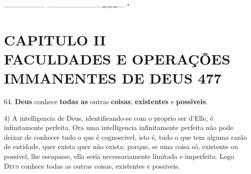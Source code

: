  ------------------ ------------------------===--- "


\chapter*{CAPITULO II\\[0.3em]\large FACULDADES E OPERAÇÕES IMMANENTES DE DEUS 477}

64. \textbf{Deus} conhece \textbf{todas as} outras \textbf{coisas}, \textbf{existentes} e \textbf{possiveis}.

4) A intelligencia de Deus, identifieando-se com o proprio ser d'Elle, é infinitamente perfeita. Ora uma intelligencia infinitamente perfeita não pode deixar de conhecer tudo o que é cognoscivel, isto é, tudo o que tem alguma razão de entidade, quer exista quer não exista; porque, se uma coisa só, existente ou possivel, lhe eseapasse, ella seria necessariamente limitada e imperfeita. Logo \textsc{Deus} conhece todas as outras coisas, existentes e possiveis.

